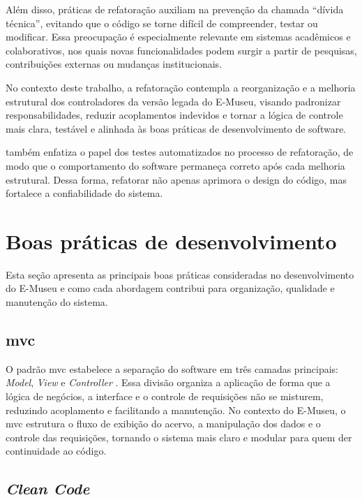 Além disso, práticas de refatoração auxiliam na prevenção da chamada ``dívida técnica'', evitando que o código se torne difícil de compreender, testar ou modificar. Essa preocupação é especialmente relevante em sistemas acadêmicos e colaborativos, nos quais novas funcionalidades podem surgir a partir de pesquisas, contribuições externas ou mudanças institucionais.

No contexto deste trabalho, a refatoração contempla a reorganização e a melhoria estrutural dos controladores da versão legada do E-Museu, visando padronizar responsabilidades, reduzir acoplamentos indevidos e tornar a lógica de controle mais clara, testável e alinhada às boas práticas de desenvolvimento de software.

 também enfatiza o papel dos testes automatizados no processo de refatoração, de modo que o comportamento do software permaneça correto após cada melhoria estrutural. Dessa forma, refatorar não apenas aprimora o design do código, mas fortalece a confiabilidade do sistema.

\section{Boas práticas de desenvolvimento}

Esta seção apresenta as principais boas práticas consideradas no desenvolvimento do E-Museu e como cada abordagem contribui para organização, qualidade e manutenção do sistema.


\subsection{\acrfull{mvc}}

O padrão \acrfull{mvc} estabelece a separação do software em três camadas principais: \textit{Model}, \textit{View} e \textit{Controller} \cite{mvc}. Essa divisão organiza a aplicação de forma que a lógica de negócios, a interface e o controle de requisições não se misturem, reduzindo acoplamento e facilitando a manutenção. No contexto do E-Museu, o \acrshort{mvc} estrutura o fluxo de exibição do acervo, a manipulação dos dados e o controle das requisições, tornando o sistema mais claro e modular para quem der continuidade ao código.


\subsection{\textit{Clean Code}}

